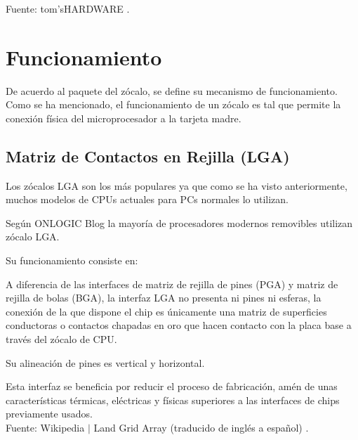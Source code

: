 \documentclass[conference]{IEEEtran}
\begin{document}
\small Fuente: tom'sHARDWARE \cite{harding-2021}.

\section{Funcionamiento}

De acuerdo al paquete del zócalo, se define su mecanismo de funcionamiento. Como se ha mencionado, el funcionamiento de un zócalo es tal que permite la conexión física del microprocesador a la tarjeta madre.

\subsection{Matriz de Contactos en Rejilla (LGA)}

Los zócalos LGA son los más populares ya que como se ha visto anteriormente, muchos modelos de CPUs actuales para PCs normales lo utilizan.

\bigbreak

Según ONLOGIC Blog \cite{fanton-2021} la mayoría de procesadores modernos removibles utilizan zócalo LGA.

\bigbreak

Su funcionamiento consiste en:

\bigbreak

\begin{displayquote}
    A diferencia de las interfaces de matriz de rejilla de pines (PGA) y matriz de rejilla de bolas (BGA), la interfaz LGA no presenta ni pines ni esferas, la conexión de la que dispone el chip es únicamente una matriz de superficies conductoras o contactos chapadas en oro que hacen contacto con la placa base a través del zócalo de CPU.

    \bigbreak

    Su alineación de pines es vertical y horizontal.

    \bigbreak

    Esta interfaz se beneficia por reducir el proceso de fabricación, amén de unas características térmicas, eléctricas y físicas superiores a las interfaces de chips previamente usados.\\
    \small
    Fuente: Wikipedia $\mid$ Land Grid Array (traducido de inglés a español) \cite{wikipedia-lga-2021D}.
\end{displayquote}
\end{document}
